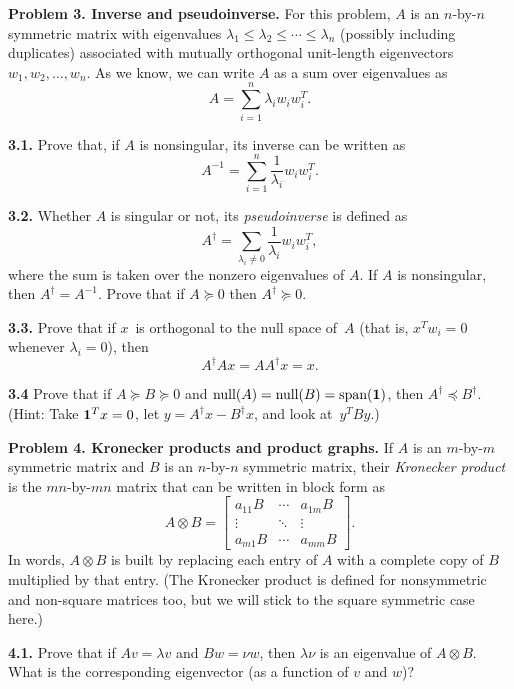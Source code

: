 \documentclass[11pt]{article}
\newcommand{\m}[1]{{\bf{#1}}}       %
\newcommand{\ones}{\m1}             %
\newcommand{\pinv}{^{\dagger}}      %
\begin{document}
\par\bigskip
{\bf Problem 3. Inverse and pseudoinverse.}
For this problem, $A$ is an $n$-by-$n$ symmetric matrix with eigenvalues
$\lambda_1\leq\lambda_2\leq\cdots\leq\lambda_n$ 
(possibly including duplicates) 
associated with mutually orthogonal unit-length eigenvectors
$w_1, w_2, \ldots, w_n$.  
As we know, we can write $A$ as a sum over eigenvalues as
$$A = \sum_{i=1}^n \lambda_i w_iw_i^T.$$

\par\medskip
{\bf 3.1.} 
Prove that, if $A$ is nonsingular, its inverse can be written as
$$A^{-1} = \sum_{i=1}^n \frac{1}{\lambda_i} w_iw_i^T.$$

\par\medskip
{\bf 3.2.} 
Whether $A$ is singular or not, its {\em pseudoinverse} is defined as
$$A\pinv = \sum_{\lambda_i\ne 0} \frac{1}{\lambda_i} w_iw_i^T,$$
where the sum is taken over the nonzero eigenvalues of $A$.
If $A$ is nonsingular, then $A\pinv=A^{-1}$.
Prove that if $A\succeq 0$ then $A\pinv\succeq 0$.

\par\medskip
{\bf 3.3.}
Prove that if $x$~is orthogonal to the null space of~$A$
(that is, $x^Tw_i=0$ whenever $\lambda_i=0$), then
$$A\pinv A x = AA\pinv x = x.$$

\par\medskip
{\bf 3.4}
Prove that if $A\succeq B\succeq 0$ and 
$\mbox{null}(A)=\mbox{null}(B)=\mbox{span}(\ones)$,
then $A\pinv \preceq B\pinv$.
(Hint: Take $\ones^T x=0$, let $y=A\pinv x-B\pinv x$, and look at~$y^TBy$.)

\par\bigskip
{\bf Problem 4. Kronecker products and product graphs.}
If $A$ is an $m$-by-$m$ symmetric matrix and $B$ is an $n$-by-$n$ symmetric matrix,
their {\em Kronecker product} is the $mn$-by-$mn$ matrix that
can be written in block form as
$$
A\otimes B = \begin{bmatrix}
  a_{11} B & \cdots & a_{1m} B \\
  \vdots   & \ddots & \vdots   \\
  a_{m1} B & \cdots & a_{mm} B
\end{bmatrix}.
$$
In words, $A\otimes B$ is built by replacing each entry of $A$ with a complete copy of $B$
multiplied by that entry.
(The Kronecker product is defined for nonsymmetric and non-square matrices too,
but we will stick to the square symmetric case here.)

\par\medskip
{\bf 4.1.}
Prove that if $Av=\lambda v$ and $Bw=\nu w$, then $\lambda\nu$ is an eigenvalue 
of $A\otimes B$. What is the corresponding eigenvector (as a function of $v$ and $w$)?
\end{document}
